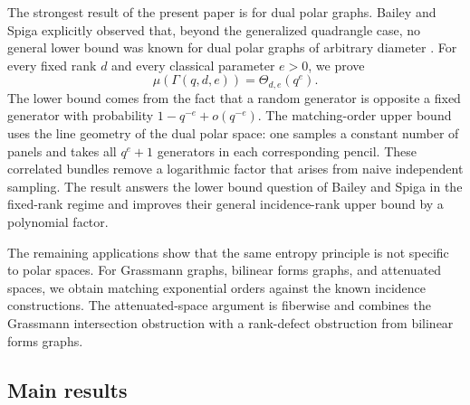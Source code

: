 \documentclass[11pt]{article}
\theoremstyle{definition}
\theoremstyle{remark}
\begin{document}
The strongest result of the present paper is for dual polar graphs.  
Bailey
and Spiga explicitly observed that, beyond the generalized quadrangle 
case,
no general lower bound was known for dual polar graphs of arbitrary
diameter \cite{BaileySpiga}.  For every fixed rank $d$ and every classical
parameter $e>0$, we prove
\[
        \mu(\Gamma(q,d,e))=\Theta_{d,e}(q^e).
\]
The lower bound comes from the fact that a random generator is opposite a
fixed generator with probability $1-q^{-e}+o(q^{-e})$.  The matching-order
upper bound uses the line geometry of the dual polar space: one samples a
constant number of panels and takes all $q^e+1$ generators in each
corresponding pencil.  These correlated bundles remove a logarithmic 
factor
that arises from naive independent sampling.  The result answers the 
lower bound
question of Bailey and Spiga in the fixed-rank regime and improves their
general incidence-rank upper bound by a polynomial factor. 

The remaining applications show that the same entropy principle is not
specific to polar spaces.  For Grassmann graphs, bilinear forms graphs, 
and
attenuated spaces, we obtain matching exponential orders against the known
incidence constructions.  The attenuated-space argument is fiberwise and
combines the Grassmann intersection obstruction with a rank-defect
obstruction from bilinear forms graphs.

\subsection*{Main results}
\end{document}
